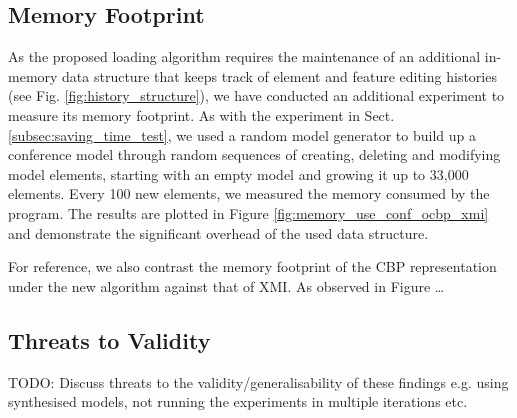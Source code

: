 \documentclass{llncs}
\begin{document}
         
\subsection{Memory Footprint}
\label{subsec:memory_consumption}

As the proposed loading algorithm requires the maintenance of an additional in-memory data structure that keeps track of element and feature editing histories (see Fig. \ref{fig:history_structure}), we have conducted an additional experiment to measure its memory footprint. As with the experiment in Sect. \ref{subsec:saving_time_test}, we used a random model generator to build up a conference model through random sequences of creating, deleting and modifying model elements, starting with an empty model and growing it up to 33,000 elements. Every 100 new elements, we measured the memory consumed by the program. The results are plotted in Figure \ref{fig:memory_use_conf_ocbp_xmi} and demonstrate the significant overhead of the used data structure.

For reference, we also contrast the memory footprint of the CBP representation under the new algorithm against that of XMI. As observed in Figure \ldots

\subsection{Threats to Validity}

TODO: Discuss threats to the validity/generalisability of these findings e.g. using synthesised models, not running the experiments in multiple iterations etc.

\end{document}

